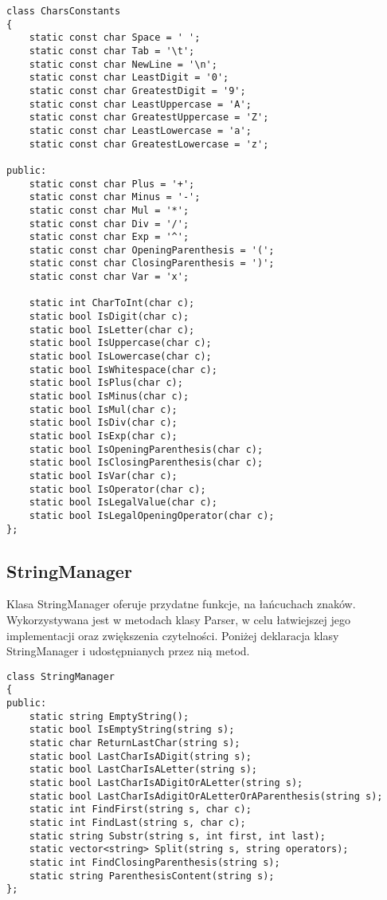 \documentclass[twoside,a4paper]{book}
\begin{document}
\begin{lstlisting}
class CharsConstants
{
	static const char Space = ' ';
	static const char Tab = '\t';
	static const char NewLine = '\n';
	static const char LeastDigit = '0';
	static const char GreatestDigit = '9';
	static const char LeastUppercase = 'A';
	static const char GreatestUppercase = 'Z';
	static const char LeastLowercase = 'a';
	static const char GreatestLowercase = 'z';
	
public:
	static const char Plus = '+';
	static const char Minus = '-';
	static const char Mul = '*';
	static const char Div = '/';
	static const char Exp = '^';
	static const char OpeningParenthesis = '(';
	static const char ClosingParenthesis = ')';
	static const char Var = 'x';
	
	static int CharToInt(char c);
	static bool IsDigit(char c);
	static bool IsLetter(char c);
	static bool IsUppercase(char c);
	static bool IsLowercase(char c);
	static bool IsWhitespace(char c);
	static bool IsPlus(char c);
	static bool IsMinus(char c);
	static bool IsMul(char c);
	static bool IsDiv(char c);
	static bool IsExp(char c);
	static bool IsOpeningParenthesis(char c);
	static bool IsClosingParenthesis(char c);
	static bool IsVar(char c);
	static bool IsOperator(char c);
	static bool IsLegalValue(char c);
	static bool IsLegalOpeningOperator(char c);
};
\end{lstlisting}

\subsection{StringManager}

Klasa StringManager oferuje przydatne funkcje, na łańcuchach znaków. Wykorzystywana jest w metodach klasy Parser, w celu łatwiejszej jego implementacji oraz zwiększenia czytelności. Poniżej deklaracja klasy StringManager i udostępnianych przez nią metod.

\begin{lstlisting}
class StringManager
{
public:
	static string EmptyString();
	static bool IsEmptyString(string s);
	static char ReturnLastChar(string s);
	static bool LastCharIsADigit(string s);
	static bool LastCharIsALetter(string s);
	static bool LastCharIsADigitOrALetter(string s);
	static bool LastCharIsAdigitOrALetterOrAParenthesis(string s);
	static int FindFirst(string s, char c);
	static int FindLast(string s, char c);
	static string Substr(string s, int first, int last);
	static vector<string> Split(string s, string operators);
	static int FindClosingParenthesis(string s);
	static string ParenthesisContent(string s);
};
\end{lstlisting}
\end{document}
